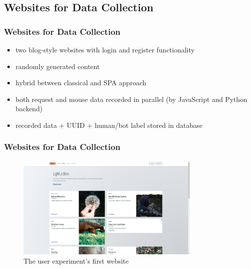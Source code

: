 \documentclass[t,aspectratio=169,table]{beamer}
\begin{document}
\subsection{Websites for Data Collection}
\begin{frame}
\frametitle{Websites for Data Collection}

\begin{itemize}
    \item two blog-style websites with login and register functionality
    \item randomly generated content
    \item hybrid between classical and SPA approach
    \item both request and mouse data recorded in parallel (by JavaScript and Python backend)
    \item recorded data + UUID + human/bot label stored in database
\end{itemize}

\end{frame}

\begin{frame}
\frametitle{Websites for Data Collection}
\begin{centering}
\begin{figure}
    \includegraphics[width=0.8\textwidth]{screenshots/fmexp1_169.png}
    \caption{The user experiment's first website}
    \label{screenshot:fmexp1}
\end{figure}
\end{centering}
\end{frame}
\end{document}
